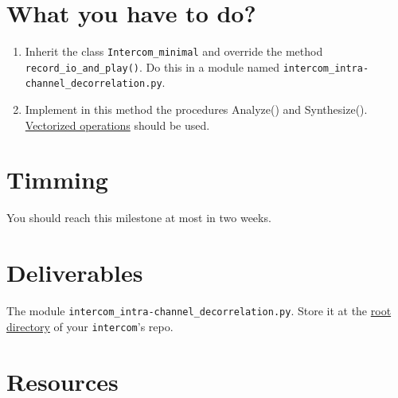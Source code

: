 \section{What you have to do?}

\begin{enumerate}
\item Inherit the class \texttt{Intercom\_minimal} and override the
  method \texttt{record\_io\_and\_play()}. Do this in a module named
  \texttt{intercom\_intra-channel\_decorrelation.py}.
\item Implement in this method the procedures Analyze() and
  Synthesize(). \href{https://www.oreilly.com/library/view/python-for-data/9781449323592/ch04.html}{Vectorized
    operations} should be used.
\end{enumerate}

\section{Timming}

You should reach this milestone at most in two weeks.

\section{Deliverables}

The module \texttt{intercom\_intra-channel\_decorrelation.py}. Store
it at the
\href{https://github.com/Tecnologias-multimedia/intercom}{root
  directory} of your \texttt{intercom}'s repo.

\section{Resources}



